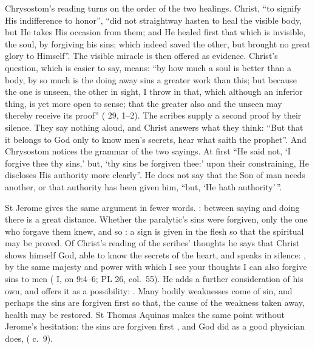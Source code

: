 Chrysostom's reading turns on the order of the two healings. Christ,
``to signify His indifference to honor'', ``did not straightway hasten to heal
the visible body, but He takes His occasion from them; and He healed first that
which is invisible, the soul, by forgiving his sins; which indeed saved the
other, but brought no great glory to Himself''. The visible miracle is then
offered as evidence. Christ's question, which is easier to say, means: ``by how
much a soul is better than a body, by so much is the doing away sins a greater
work than this; but because the one is unseen, the other in sight, I throw in
that, which although an inferior thing, is yet more open to sense; that the
greater also and the unseen may thereby receive its proof''
( 29, 1--2). The scribes supply a second proof by their
silence. They say nothing aloud, and Christ answers what they think: ``But that
it belongs to God only to know men's secrets, hear what saith the prophet''.
And Chrysostom notices the grammar of the two sayings. At first ``He said not,
`I forgive thee thy sins,' but, `thy sins be forgiven thee:' upon their
constraining, He discloses His authority more clearly''. He does not say that
the Son of man needs another, or that authority has been given him, ``but,
`He hath authority'\,''.

St Jerome gives the same argument in fewer words. : between saying and doing there is a great
distance. Whether the paralytic's sins were forgiven, only the one who forgave
them knew, and so : a
sign is given in the flesh so that the spiritual may be proved. Of Christ's
reading of the scribes' thoughts he says that Christ shows himself God, able to
know the secrets of the heart, and speaks in silence: , by the same majesty and power with which I see your thoughts I can
also forgive sins to men ( I, on 9:4--6; PL 26,
col.~55). He adds a further consideration of his own, and offers it as a
possibility: . Many bodily weaknesses come
of sin, and perhaps the sins are forgiven first so that, the cause of the
weakness taken away, health may be restored. St Thomas Aquinas makes the same
point without Jerome's hesitation: the sins are forgiven first , and God did as a good physician does,
 ( c.~9).

